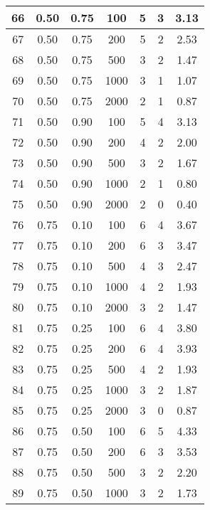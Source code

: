\documentclass[a4paper, 12pt, unknownkeysallowed]{extreport}
\begin{document}
\begin{center}
\begin{longtable}[c]{|c|c|c|c|c|c|c|}
    66 & 0.50 & 0.75 &   100 &    5 &    3 &  3.13 \\ \hline
    67 & 0.50 & 0.75 &   200 &    5 &    2 &  2.53 \\ \hline
    68 & 0.50 & 0.75 &   500 &    3 &    2 &  1.47 \\ \hline
    69 & 0.50 & 0.75 &  1000 &    3 &    1 &  1.07 \\ \hline
    70 & 0.50 & 0.75 &  2000 &    2 &    1 &  0.87 \\ \hline
    71 & 0.50 & 0.90 &   100 &    5 &    4 &  3.13 \\ \hline
    72 & 0.50 & 0.90 &   200 &    4 &    2 &  2.00 \\ \hline
    73 & 0.50 & 0.90 &   500 &    3 &    2 &  1.67 \\ \hline
    74 & 0.50 & 0.90 &  1000 &    2 &    1 &  0.80 \\ \hline
    75 & 0.50 & 0.90 &  2000 &    2 &    0 &  0.40 \\ \hline
    76 & 0.75 & 0.10 &   100 &    6 &    4 &  3.67 \\ \hline
    77 & 0.75 & 0.10 &   200 &    6 &    3 &  3.47 \\ \hline
    78 & 0.75 & 0.10 &   500 &    4 &    3 &  2.47 \\ \hline
    79 & 0.75 & 0.10 &  1000 &    4 &    2 &  1.93 \\ \hline
    80 & 0.75 & 0.10 &  2000 &    3 &    2 &  1.47 \\ \hline
    81 & 0.75 & 0.25 &   100 &    6 &    4 &  3.80 \\ \hline
    82 & 0.75 & 0.25 &   200 &    6 &    4 &  3.93 \\ \hline
    83 & 0.75 & 0.25 &   500 &    4 &    2 &  1.93 \\ \hline
    84 & 0.75 & 0.25 &  1000 &    3 &    2 &  1.87 \\ \hline
    85 & 0.75 & 0.25 &  2000 &    3 &    0 &  0.87 \\ \hline
    86 & 0.75 & 0.50 &   100 &    6 &    5 &  4.33 \\ \hline
    87 & 0.75 & 0.50 &   200 &    6 &    3 &  3.53 \\ \hline
    88 & 0.75 & 0.50 &   500 &    3 &    2 &  2.20 \\ \hline
    89 & 0.75 & 0.50 &  1000 &    3 &    2 &  1.73 \\ \hline
\end{longtable}
\end{center}
\end{document}

